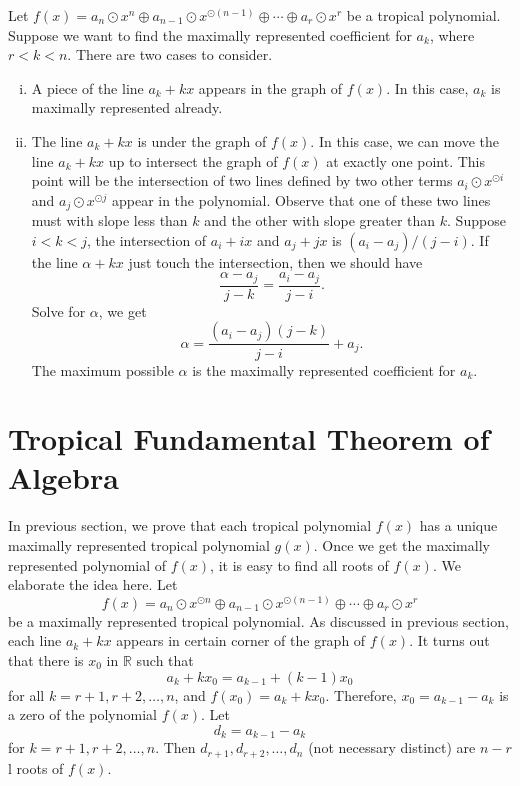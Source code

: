 \documentclass{amsart}
\theoremstyle{definition}
\theoremstyle{remark}
\begin{document}
Let $f(x) = a_n {\odot} x^n {\oplus} a_{n-1} {\odot} x^{{\odot} (n-1)} {\oplus} \cdots {\oplus} a_r {\odot} x^r$ be a tropical polynomial. Suppose we want to find the maximally represented coefficient for $a_k$, where $r < k < n$. There are two cases to consider.

\begin{enumerate}[(i)]
\item A piece of the line $a_k + k x$ appears in the graph of $f(x)$. In this case, $a_k$ is maximally represented already.
\item The line $a_k + kx$ is under the graph of $f(x)$. In this case, we can move the line $a_k + kx$ up to intersect the graph of $f(x)$ at exactly one point. This point will be the intersection of two lines defined by two other terms $a_i {\odot} x^{{\odot} i}$ and $a_j {\odot} x^{{\odot} j}$ appear in the polynomial. Observe that one of these two lines must with slope less than $k$ and the other with slope greater than $k$. Suppose $i < k < j$, the intersection of $a_i + ix$ and $a_j + jx$ is $(a_i - a_j) / (j-i)$. If the line $\alpha + kx$ just touch the intersection, then we should have
\[
\frac{\alpha - a_j}{j - k} = \frac{a_i - a_j}{j-i}.
\]
Solve for $\alpha$, we get
\[
\alpha = \frac{(a_i - a_j) (j-k)}{j-i} + a_j.
\]
The maximum possible $\alpha$ is the maximally represented coefficient for $a_k$.
\end{enumerate}

\section{Tropical Fundamental Theorem of Algebra}
In previous section, we prove that each tropical polynomial $f(x)$ has a unique maximally represented tropical polynomial $g(x)$. Once we get the maximally represented polynomial of $f(x)$, it is easy to find all roots of $f(x)$. We elaborate the idea here. Let
\[
f(x) = a_n {\odot} x^{{\odot} n} {\oplus} a_{n-1} {\odot} x^{{\odot} (n -1)} {\oplus} \cdots {\oplus} a_r {\odot} x^r
\]
be a maximally represented tropical polynomial. As discussed in previous section, each line $a_k + kx$ appears in certain corner of the graph of $f(x)$. It turns out that there is $x_0$ in ${\mathbb{R}}$ such that
\[
a_k + k x_0 = a_{k-1} + (k-1)x_0
\]
for all $k = r+1, r+2, \ldots, n$, and $f(x_0) =  a_k + k x_0$. Therefore, $x_0 = a_{k-1} - a_k$ is a zero of the polynomial $f(x)$. Let
\[
d_k = a_{k-1} - a_k
\]
for $k = r+1, r+2, \ldots, n$. Then $d_{r+1}, d_{r+2}, \ldots, d_n$ (not necessary distinct) are $n-r$l roots of $f(x)$.
\end{document}

